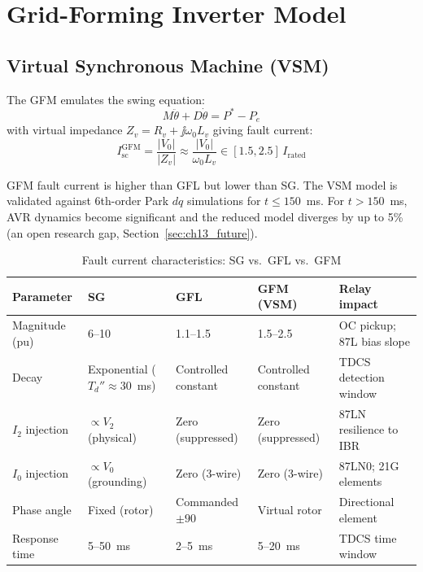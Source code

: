 \section{Grid-Forming Inverter Model}
\label{sec:ch3_gfm}

\subsection{Virtual Synchronous Machine (VSM)}

The GFM emulates the swing equation:
\begin{equation}
  M\ddot{\theta} + D\dot{\theta} = P^\ast - P_e
\end{equation}
with virtual impedance $Z_v = R_v + \jj\omega_0 L_v$ giving fault current:
\begin{equation}
  I_\mathrm{sc}^\mathrm{GFM} = \frac{|V_0|}{|Z_v|} \approx \frac{|V_0|}{\omega_0 L_v}
  \in [1.5, 2.5]\,I_\mathrm{rated}
\end{equation}

GFM fault current is higher than GFL but lower than SG. The VSM model
is validated against 6th-order Park $dq$ simulations for $t \leq 150$~ms.
For $t > 150$~ms, AVR dynamics become significant and the reduced model
diverges by up to 5\% (an open research gap, Section~\ref{sec:ch13_future}).

\begin{table}[htbp]
\caption{Fault current characteristics: SG vs.\ GFL vs.\ GFM}
\label{tab:ch3_fault_comparison}
\begin{tabularx}{\textwidth}{@{}lp{3cm}p{3cm}p{3cm}X@{}}
\toprule
Parameter & SG & GFL & GFM (VSM) & Relay impact \\
\midrule
Magnitude (pu) & 6--10 & 1.1--1.5 & 1.5--2.5
  & OC pickup; 87L bias slope \\
Decay & Exponential ($T_d'' \!\approx\! 30$~ms) & Controlled constant
  & Controlled constant
  & TDCS detection window \\
$I_2$ injection & $\propto V_2$ (physical) & Zero (suppressed)
  & Zero (suppressed)
  & 87LN resilience to IBR \\
$I_0$ injection & $\propto V_0$ (grounding) & Zero (3-wire)
  & Zero (3-wire)
  & 87LN0; 21G elements \\
Phase angle & Fixed (rotor) & Commanded $\pm 90$
  & Virtual rotor
  & Directional element \\
Response time & 5--50~ms & 2--5~ms & 5--20~ms
  & TDCS time window \\
\bottomrule
\end{tabularx}
\end{table}

